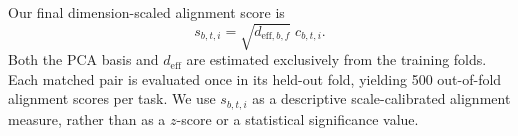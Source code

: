 



Our final dimension-scaled alignment score is
\[
s_{b,t,i}
=
\sqrt{d_{\mathrm{eff},b,f}}\;c_{b,t,i}.
\]
Both the PCA basis and $d_{\mathrm{eff}}$ are estimated exclusively from the training folds. Each matched pair is evaluated once in its held-out fold, yielding 500 out-of-fold alignment scores per task. We use $s_{b,t,i}$ as a descriptive scale-calibrated alignment measure, rather than as a $z$-score or a statistical significance value.

